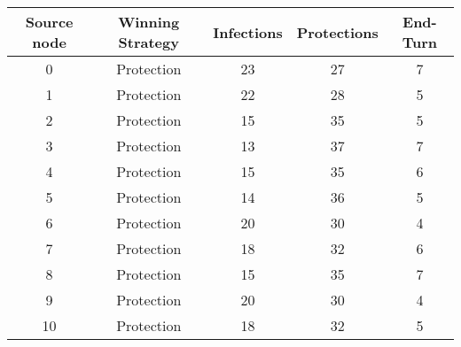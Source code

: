 \documentclass[results.tex]{subfiles}
\begin{document}
    \begin{center}
        \begin{tabular}{| c || c | c | c | c |}
            \hline
            {\bfseries Source node} & {\bfseries Winning Strategy} & {\bfseries Infections} & {\bfseries Protections}
            & {\bfseries End-Turn}
            \\  %
            \hline\hline
            0                       & Protection                   & 23                     & 27                      & 7                    \\
            \hline
            1                       & Protection                   & 22                     & 28                      & 5                    \\
            \hline
            2                       & Protection                   & 15                     & 35                      & 5                    \\
            \hline
            3                       & Protection                   & 13                     & 37                      & 7                    \\
            \hline
            4                       & Protection                   & 15                     & 35                      & 6                    \\
            \hline
            5                       & Protection                   & 14                     & 36                      & 5                    \\
            \hline
            6                       & Protection                   & 20                     & 30                      & 4                    \\
            \hline
            7                       & Protection                   & 18                     & 32                      & 6                    \\
            \hline
            8                       & Protection                   & 15                     & 35                      & 7                    \\
            \hline
            9                       & Protection                   & 20                     & 30                      & 4                    \\
            \hline
            10                      & Protection                   & 18                     & 32                      & 5                    \\

\end{tabular}
\end{center}
\end{document}

